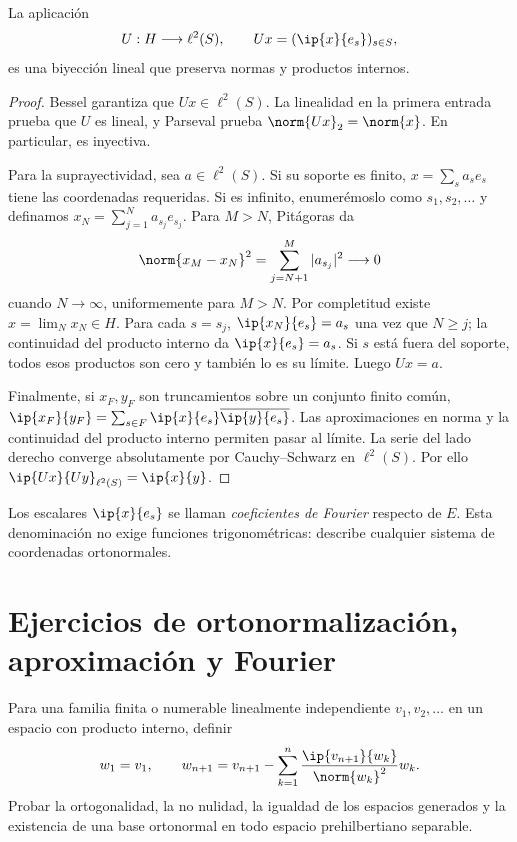 \begin{teorema}\label{ch31:rieszfischer}
La aplicación
\[
 U:H\longrightarrow\ell^{2}(S),\qquad Ux=(\ip{x}{e_s})_{s\in S},
\]
es una biyección lineal que preserva normas y productos internos.
\end{teorema}
\begin{proof}
Bessel garantiza que $Ux\in\ell^{2}(S)$. La linealidad en la primera entrada prueba que $U$ es lineal, y Parseval prueba $\norm{Ux}_2=\norm{x}$. En particular, es inyectiva.

Para la suprayectividad, sea $a\in\ell^{2}(S)$. Si su soporte es finito, $x=\sum_s a_se_s$ tiene las coordenadas requeridas. Si es infinito, enumerémoslo como $s_1,s_2,\dots$ y definamos $x_N=\sum_{j=1}^{N}a_{s_j}e_{s_j}$. Para $M>N$, Pitágoras da
\[
 \norm{x_M-x_N}^{2}=\sum_{j=N+1}^{M}|a_{s_j}|^{2}\longrightarrow0
\]
cuando $N\to\infty$, uniformemente para $M>N$. Por completitud existe $x=\lim_Nx_N\in H$. Para cada $s=s_j$, $\ip{x_N}{e_s}=a_s$ una vez que $N\geq j$; la continuidad del producto interno da $\ip{x}{e_s}=a_s$. Si $s$ está fuera del soporte, todos esos productos son cero y también lo es su límite. Luego $Ux=a$.

Finalmente, si $x_F,y_F$ son truncamientos sobre un conjunto finito común, $\ip{x_F}{y_F}=\sum_{s\in F}\ip{x}{e_s}\overline{\ip{y}{e_s}}$. Las aproximaciones en norma y la continuidad del producto interno permiten pasar al límite. La serie del lado derecho converge absolutamente por Cauchy--Schwarz en $\ell^{2}(S)$. Por ello $\ip{Ux}{Uy}_{\ell^{2}(S)}=\ip{x}{y}$.
\end{proof}
Los escalares $\ip{x}{e_s}$ se llaman \emph{coeficientes de Fourier} respecto de $E$. Esta denominación no exige funciones trigonométricas: describe cualquier sistema de coordenadas ortonormales.

\section{Ejercicios de ortonormalización, aproximación y Fourier}

\begin{ejercicio}\label{ej:lectura-31-1}
Para una familia finita o numerable linealmente independiente $v_1,v_2,\dots$ en un espacio con producto interno, definir
\[
 w_1=v_1,\qquad
 w_{n+1}=v_{n+1}-\sum_{k=1}^{n}\frac{\ip{v_{n+1}}{w_k}}{\norm{w_k}^{2}}w_k.
\]
Probar la ortogonalidad, la no nulidad, la igualdad de los espacios generados y la existencia de una base ortonormal en todo espacio prehilbertiano separable.
\end{ejercicio}


